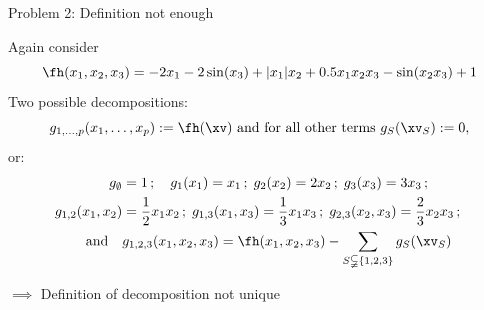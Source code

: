 \documentclass[11pt,compress,t,notes=noshow, aspectratio=169, xcolor=table]{beamer}
\begin{document}
\begin{frame}{Problem 2: Definition not enough}

    \begin{example}
        Again consider
        $$
        \fh(x_1, x_2, x_3) = - 2x_1 - 2\sin(x_3) + |x_1|x_2 + 0.5 x_1 x_2 x_3 - \sin(x_2 x_3) + 1
        $$
        \pause
        Two possible decompositions:
        $$
            g_{1, \dots, p}(x_1, \dots, x_p) := \fh(\xv) \text{ and for all other terms } g_S(\xv_S) := 0 ,
        $$
        or:
        \begin{align*}
            g_\emptyset & = 1 \,;\quad
            g_1(x_1) = x_1 \,;\;
            g_2(x_2) = 2x_2 \,;\;
            g_3(x_3) = 3x_3 \,;\quad \\
            g_{1,2}(x_1, x_2) & = \frac{1}{2} x_1 x_2 \,;\;
            g_{1,3}(x_1, x_3) = \frac{1}{3} x_1 x_3 \,;\;
            g_{2,3}(x_2, x_3) = \frac{2}{3} x_2 x_3 \,;\; \\
            \text{ and} \quad
            & g_{1,2,3}(x_1, x_2, x_3) = \fh(x_1, x_2, x_3) - \sum_{S \subsetneqq \{1,2,3\}} g_S(\xv_S)
        \end{align*}
    \end{example}
    \pause
    \(\implies\) Definition of decomposition not unique \\
    
\end{frame}
\end{document}
